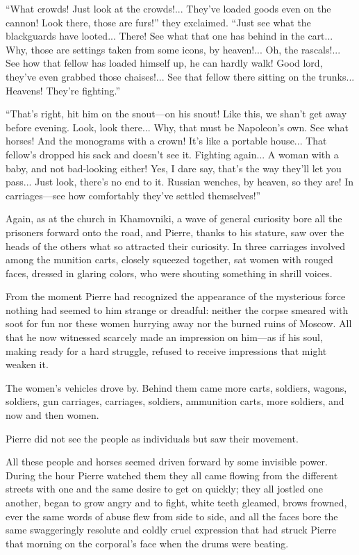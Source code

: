 ``What crowds! Just look at the crowds!... They've loaded goods
even on the cannon! Look there, those are furs!'' they
exclaimed. ``Just see what the blackguards have looted... There!
See what that one has behind in the cart... Why, those are
settings taken from some icons, by heaven!... Oh, the
rascals!... See how that fellow has loaded himself up, he can
hardly walk! Good lord, they've even grabbed those
chaises!... See that fellow there sitting on the
trunks... Heavens!  They're fighting.''

``That's right, hit him on the snout---on his snout! Like this,
we shan't get away before evening. Look, look there... Why, that
must be Napoleon's own. See what horses! And the monograms with a
crown! It's like a portable house... That fellow's dropped his
sack and doesn't see it. Fighting again... A woman with a baby,
and not bad-looking either!  Yes, I dare say, that's the way
they'll let you pass... Just look, there's no end to it. Russian
wenches, by heaven, so they are! In carriages---see how
comfortably they've settled themselves!''

Again, as at the church in Khamovniki, a wave of general
curiosity bore all the prisoners forward onto the road, and
Pierre, thanks to his stature, saw over the heads of the others
what so attracted their curiosity. In three carriages involved
among the munition carts, closely squeezed together, sat women
with rouged faces, dressed in glaring colors, who were shouting
something in shrill voices.

From the moment Pierre had recognized the appearance of the
mysterious force nothing had seemed to him strange or dreadful:
neither the corpse smeared with soot for fun nor these women
hurrying away nor the burned ruins of Moscow. All that he now
witnessed scarcely made an impression on him---as if his soul,
making ready for a hard struggle, refused to receive impressions
that might weaken it.

The women's vehicles drove by. Behind them came more carts,
soldiers, wagons, soldiers, gun carriages, carriages, soldiers,
ammunition carts, more soldiers, and now and then women.

Pierre did not see the people as individuals but saw their
movement.

All these people and horses seemed driven forward by some
invisible power. During the hour Pierre watched them they all
came flowing from the different streets with one and the same
desire to get on quickly; they all jostled one another, began to
grow angry and to fight, white teeth gleamed, brows frowned, ever
the same words of abuse flew from side to side, and all the faces
bore the same swaggeringly resolute and coldly cruel expression
that had struck Pierre that morning on the corporal's face when
the drums were beating.

